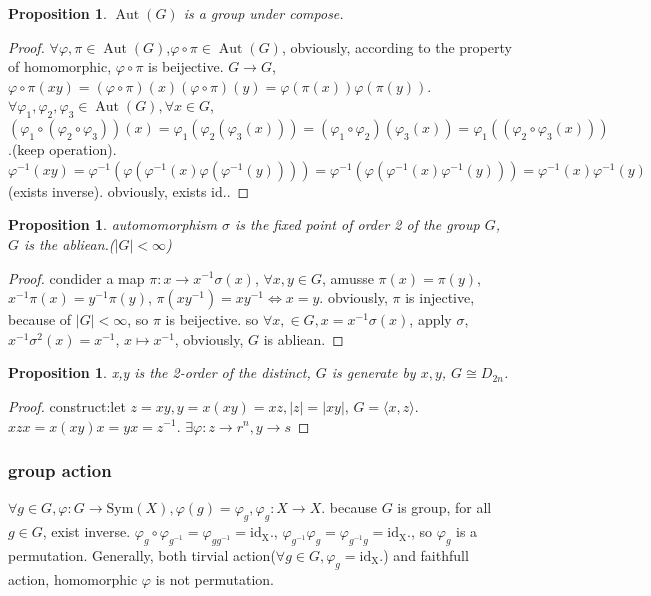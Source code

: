 \documentclass[10pt,a4paper]{article}
\newtheorem{proposition}[theorem]{Proposition}
\begin{document}
\begin{proposition}
    $\operatorname{Aut}(G)$ is a group under compose.
\end{proposition}
\begin{proof}
    $\forall\varphi,\pi\in\operatorname{Aut}(G)$,$\varphi\circ\pi\in\operatorname{Aut}(G)$, obviously, according to the property of homomorphic, $\varphi\circ\pi$ is beijective.
    $G\to G$, $\varphi\circ\pi(xy)=(\varphi\circ\pi)(x)(\varphi\circ\pi)(y)=\varphi(\pi(x))\varphi(\pi(y))$.
    $\forall\varphi_1,\varphi_2,\varphi_3\in\operatorname{Aut}(G),\forall x\in G$, $(\varphi_1\circ(\varphi_2\circ\varphi_3))(x)=\varphi_1(\varphi_2(\varphi_3(x)))=(\varphi_1\circ\varphi_2)(\varphi_3(x))=\varphi_1((\varphi_2\circ\varphi_3(x)))$.(keep operation).
    $\varphi^{-1}(xy)=\varphi^{-1}(\varphi(\varphi^{-1}(x)\varphi(\varphi^{-1}(y))))=\varphi^{-1}(\varphi(\varphi^{-1}(x)\varphi^{-1}(y)))=\varphi^{-1}(x)\varphi^{-1}(y)$(exists inverse). obviously, exists $\mathrm{id.}$.
\end{proof}
\begin{proposition}
    automomorphism $\sigma$ is the fixed point of order 2 of the group $G$, $G$ is the abliean.($|G|<\infty$)
\end{proposition}
\begin{proof}
    condider a map $\pi:x\to x^{-1}\sigma(x)$, $\forall x,y\in G$, amusse $\pi(x)=\pi(y)$, 
    $x^{-1}\pi(x)=y^{-1}\pi(y)$, $\pi(xy^{-1})=xy^{-1}\iff x=y$. obviously, $\pi$ is injective, 
    because of $|G|<\infty$, so $\pi$ is beijective. so $\forall x,\in G, x=x^{-1}\sigma(x)$, apply $\sigma$, $x^{-1}\sigma^{2}(x)=x^{-1}$, $x\mapsto x^{-1}$, obviously, $G$ is abliean.
\end{proof}
\begin{proposition}
    x,y is the 2-order of the distinct, $G$ is generate by $x,y$, $G\cong D_{2n}$.
\end{proposition}
\begin{proof}
    construct:let $z=xy,y=x(xy)=xz, |z|=|xy|$, $G=\langle x,z\rangle$. $xzx=x(xy)x=yx=z^{-1}$.
    $\exists\varphi:z\to r^n,y\to s$
\end{proof}
\subsubsection{group action}
$\forall g\in G,\varphi:G\to\mathrm{Sym}(X),\varphi(g)=\varphi_g,\varphi_g:X\to X$.
because $G$ is group, for all $g\in G$, exist inverse. $\varphi_g\circ\varphi_{g^{-1}}=\varphi_{gg^{-1}}=\mathrm{id_X.}$,
$\varphi_{g^{-1}}\varphi_g=\varphi_{g^{-1}g}=\mathrm{id_X.}$, so $\varphi_g$ is a permutation. Generally, both tirvial action($\forall g\in G,\varphi_g=\mathrm{id_X.}$) 
and faithfull action, homomorphic $\varphi$ is not permutation.  
\end{document}
